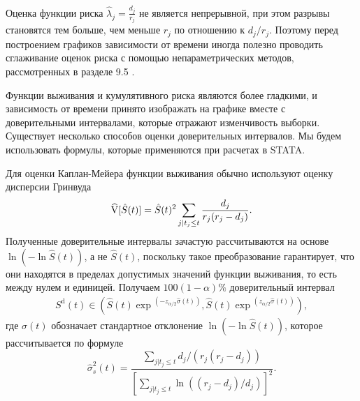 \noindent
Оценка функции риска $\hat{\lambda}_j=\frac{d_j}{r_j}$ не является непрерывной, при этом разрывы становятся тем больше, чем меньше $r_j$ по отношению к $d_j/r_j$. Поэтому перед построением графиков зависимости от времени иногда полезно проводить сглаживание оценок риска с помощью непараметрических методов, рассмотренных в разделе 9.5%
.

Функции выживания и кумулятивного риска являются более гладкими, и зависимость от времени принято изображать на графике вместе с доверительными интервалами, которые отражают изменчивость выборки. Существует несколько способов оценки доверительных интервалов. Мы будем использовать формулы, которые применяются при расчетах в STATA.

Для оценки Каплан-Мейера функции выживания обычно используют оценку дисперсии Гринвуда
    $$\widehat{\mathrm{V}}[\hat{S}(t)]=\hat{S}(t)^2\sum_{j|t_j\le t}\frac{d_j}{r_j(r_j-d_j)}.$$
Полученные доверительные интервалы зачастую рассчитываются на основе $\ln(-\ln\hat{S}(t))$, а не $\hat{S}(t)$, поскольку такое преобразование гарантирует, что они находятся в пределах допустимых значений
функции выживания, то есть между нулем и единицей. Получаем $100(1-\alpha)\%$ доверительный интервал
        \begin{align}
        \label{eq:17.15}
        S^{\mathrm{d}}(t)\in (\hat{S}(t)\exp{}^{(-z_{\alpha/2} \hat{\sigma}(t))},\hat{S}(t)\exp{}^{(z_{\alpha/2} \hat{\sigma}(t))}),
        \end{align}
где $\sigma(t)$ обозначает стандартное отклонение $\ln(-\ln\hat{S}(t))$, которое рассчитывается по формуле
    $$\hat{\sigma}^2_s(t)=\frac{\sum_{j|t_j\le t} d_j/(r_j(r_j-d_j))}{\left[ \sum_{j|t_j\le t} \ln ((r_j-d_j)/d_j)\right] ^2}.$$

